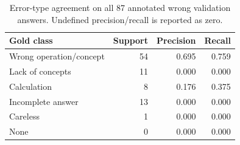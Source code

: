 \begin{table}[htbp]\centering\small
\caption{Error-type agreement on all 87 annotated wrong validation answers. Undefined precision/recall is reported as zero.}\label{tab:analyzer}
\begin{tabular}{@{}lrrr@{}}\toprule
Gold class & Support & Precision & Recall\\\midrule
Wrong operation/concept & 54 & 0.695 & 0.759\\
Lack of concepts & 11 & 0.000 & 0.000\\
Calculation & 8 & 0.176 & 0.375\\
Incomplete answer & 13 & 0.000 & 0.000\\
Careless & 1 & 0.000 & 0.000\\
None & 0 & 0.000 & 0.000\\
\bottomrule\end{tabular}\end{table}

